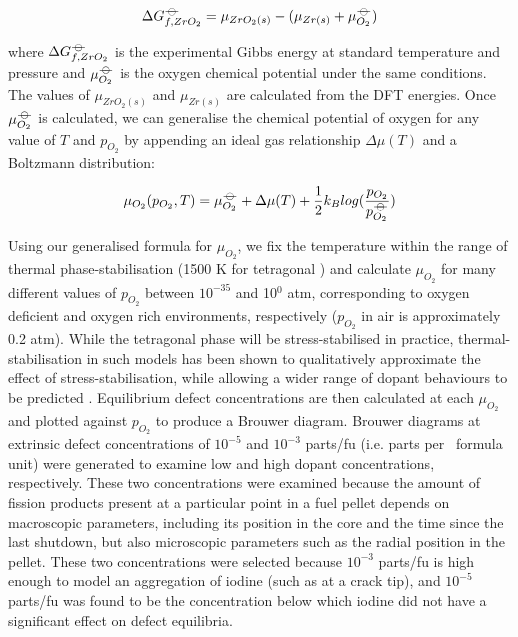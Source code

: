 \begin{equation}
\Delta{G^{{\ensuremath{-\kern-4pt{\ominus}\kern-4pt-}}}_{f, ZrO_2}} = \mu_{ZrO_2(s)} - (\mu_{Zr(s)} + \mu^{{-\kern-4pt{\ominus}\kern-4pt-}}_{O_2})
\end{equation}

where $\Delta{G^{{\ensuremath{-\kern-4pt{\ominus}\kern-4pt-}}}_{f, ZrO_2}}$ is the experimental Gibbs energy at standard temperature and pressure and $\mu^{{-\kern-4pt{\ominus}\kern-4pt-}}_{O_2}$ is the oxygen chemical potential under the same conditions. The values of $\mu_{ZrO_2(s)}$ and $\mu_{Zr(s)}$ are calculated from the DFT energies. Once $\mu^{{-\kern-4pt{\ominus}\kern-4pt-}}_{O_2}$ is calculated, we can generalise the chemical potential of oxygen for any value of $T$ and $p_{O_2}$ by appending an ideal gas relationship $\Delta{\mu(T)}$ and a Boltzmann distribution:

\begin{equation}
\mu_{O_2}(p_{O_2},T) = \mu^{{-\kern-4pt{\ominus}\kern-4pt-}}_{O_2} + \Delta{\mu(T)} + \frac{1}{2}{k_B}log(\frac{p_{O_2}}{p^{{-\kern-4pt{\ominus}\kern-4pt-}}_{O_2}})
\end{equation}

Using our generalised formula for $\mu_{O_2}$, we fix the temperature within the range of thermal phase-stabilisation (1500 K for tetragonal \zirconia) and calculate $\mu_{O_2}$ for many different values of $p_{O_2}$ between $10^{-35}$ and 10$^{0}$ atm, corresponding to oxygen deficient and oxygen rich environments, respectively ($p_{O_2}$ in air is approximately 0.2 atm). While the tetragonal phase will be stress-stabilised in practice, thermal-stabilisation in such models has been shown to qualitatively approximate the effect of stress-stabilisation, while allowing a wider range of dopant behaviours to be predicted \cite{Bell2016}. Equilibrium defect concentrations are then calculated at each $\mu_{O_2}$ and plotted against $p_{O_2}$ to produce a Brouwer diagram. Brouwer diagrams at extrinsic defect concentrations of $10^{-5}$ and $10^{-3}$ parts/fu (i.e. parts per \zirconia\ formula unit) were generated to examine low and high dopant concentrations, respectively. These two concentrations were examined because the amount of fission products present at a particular point in a fuel pellet depends on macroscopic parameters, including its position in the core and the time since the last shutdown, but also microscopic parameters such as the radial position in the pellet. These two concentrations were selected because $10^{-3}$ parts/fu is high enough to model an aggregation of iodine (such as at a crack tip), and $10^{-5}$ parts/fu was found to be the concentration below which iodine did not have a significant effect on defect equilibria. 

